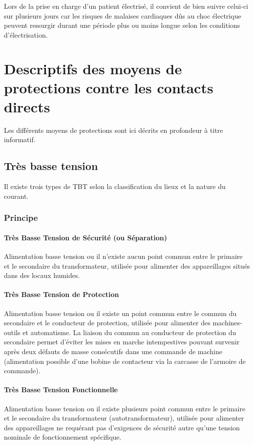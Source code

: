Lors de la prise en charge d'un patient électrisé, il convient de bien suivre celui-ci sur plusieurs jours car les risques de malaises cardiaques dûs au choc électrique peuvent ressurgir durant une période plus ou moins longue selon les conditions d'électrisation.

\section{Descriptifs des moyens de protections contre les contacts directs}

Les différents moyens de protections sont ici décrits en profondeur à titre informatif.

\subsection{Très basse tension\label{subsec:TBT}}

Il existe trois types de TBT selon la classification du lieux et la nature du courant.

\subsubsection{Principe}

\paragraph{Très Basse Tension de Sécurité (ou Séparation)} Alimentation basse tension ou il n'existe aucun point commun entre le primaire et le secondaire du transformateur, utilisée pour alimenter des appareillages situés dans des locaux humides.
\paragraph{Très Basse Tension de Protection} Alimentation basse tension ou il existe un point commun entre le commun du secondaire et le conducteur de protection, utilisée pour alimenter des machines-outils et automatisme. La liaison du commun au conducteur de protection du secondaire permet d'éviter les mises en marche intempestives pouvant survenir après deux défauts de masse consécutifs dans une commande de machine (alimentation possible d'une bobine de contacteur via la carcasse de l'armoire de commande).
\paragraph{Très Basse Tension Fonctionnelle} Alimentation basse tension ou il existe plusieurs point commun entre le primaire et le secondaire du transformateur (autotransformateur), utilisée pour alimenter des appareillages ne requérant pas d'exigences de sécurité autre qu'une tension nominale de fonctionnement spécifique.

